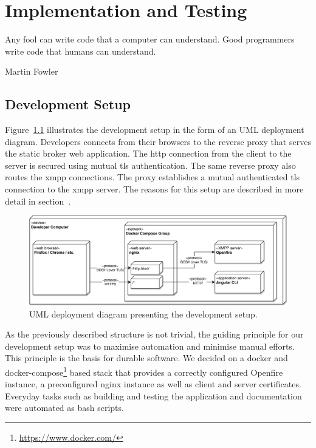 \chapter{Implementation and Testing} %
\epigraph{Any fool can write code that a computer can understand. Good programmers write code that humans can understand.}{Martin Fowler}


\section{Development Setup}\label{sec:development-setup}

Figure~\ref{fig:development-setup} illustrates the development setup in the form of an UML deployment diagram.
Developers connects from their browsers to the reverse proxy that serves the static \gls{broker} web application.
The \gls{http} connection from the client to the server is secured using mutual \gls{tls} authentication.
The same reverse proxy also routes the \gls{xmpp} connections.
The proxy establishes a mutual authenticated \gls{tls} connection to the \gls{xmpp} server.
The reasons for this setup are described in more detail in section~.

\begin{figure}[h]
    \centering
    \includegraphics[width=1\linewidth]{resources/development-setup-uml}
    \caption[Development setup deployment diagram]{UML deployment diagram presenting the development setup.}
    \label{fig:development-setup}
\end{figure}

As the previously described structure is not trivial, the guiding principle for our development setup was to maximise automation and minimise manual efforts.
This principle is the basis for durable software.
We decided on a docker and docker-compose\footnote{\url{https://www.docker.com/}} based stack that provides a correctly configured Openfire instance, a preconfigured nginx instance as well as client and server certificates.
Everyday tasks such as building and testing the application and documentation were automated as bash scripts.

